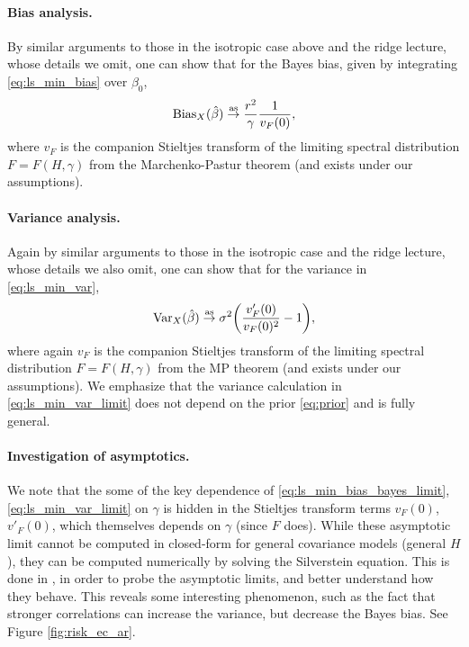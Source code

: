 \documentclass{article}
\begin{document}
\paragraph{Bias analysis.}

By similar arguments to those in the isotropic case above and the ridge lecture,
whose details we omit, one can show that for the Bayes bias, given by
integrating \eqref{eq:ls_min_bias} over $\beta_0$,
\begin{equation}
\label{eq:ls_min_bias_bayes_limit}
\mathrm{Bias}_X(\hat{\beta}) \overset{\mathrm{as}}{\to} \frac{r^2}{\gamma} \frac{1}{v_F(0)},  
\end{equation}
where $v_F$ is the companion Stieltjes transform of the limiting spectral
distribution $F = F(H, \gamma)$ from the Marchenko-Pastur theorem (and
 exists under our assumptions).  

\paragraph{Variance analysis.}

Again by similar arguments to those in the isotropic case and the ridge lecture,
whose details we also omit, one can show that for the variance in
\eqref{eq:ls_min_var},  
\begin{equation}
\label{eq:ls_min_var_limit}
\mathrm{Var}_X(\hat{\beta}) \overset{\mathrm{as}}{\to} \sigma^2 \bigg(\frac{v'_F(0)}{v_F(0)^2} - 1 \bigg),
\end{equation}
where again $v_F$ is the companion Stieltjes transform of the limiting spectral 
distribution $F = F(H, \gamma)$ from the MP theorem (and
 exists under our
assumptions). We emphasize that the variance calculation in
\eqref{eq:ls_min_var_limit} does not depend on the prior \eqref{eq:prior} and is
fully general.    

\paragraph{Investigation of asymptotics.}

We note that the some of the key dependence of
\eqref{eq:ls_min_bias_bayes_limit}, \eqref{eq:ls_min_var_limit} on $\gamma$ is
hidden in the Stieltjes transform terms $v_F(0)$, $v'_F(0)$, which themselves
depends on $\gamma$ (since $F$ does). While these asymptotic limit cannot be
computed in closed-form for general covariance models (general $H$), they can be
computed numerically by solving the Silverstein equation. This is done in
\citet{hastie2022surprises}, in order to probe the asymptotic limits, and better
understand how they behave. This reveals some interesting phenomenon, such as
the fact that stronger correlations can increase the variance, but decrease the
Bayes bias. See Figure \ref{fig:risk_ec_ar}. 
\end{document}
